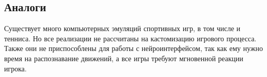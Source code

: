 \documentclass[a4paper,12pt]{article}
\begin{document}
\subsection*{Аналоги}

\noindent
Существует много компьютерных эмуляций спортивных игр, в том числе и тенниса. Но все реализации не рассчитаны на кастомизацию игрового процесса. Также они не приспособлены для работы с нейроинтерфейсом, так как ему нужно время на распознавание движений, а все игры требуют мгновенной реакции игрока.
\end{document}
